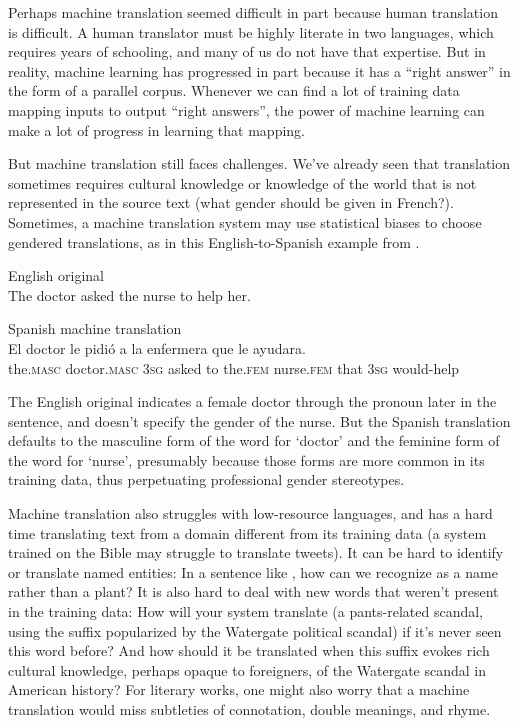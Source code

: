 Perhaps machine translation seemed difficult in part because human translation is difficult. A human translator must be highly literate in two languages, which requires years of schooling, and many of us do not have that expertise.  But in reality, machine learning has progressed in part because it has a ``right answer'' in the form of a parallel corpus.  Whenever we can find a lot of training data mapping inputs to output  ``right answers'', the power of machine learning can make a lot of progress in learning that mapping.

But machine translation still faces challenges.  We've already seen that translation sometimes requires cultural knowledge or knowledge of the world that is not represented in the source text (what gender should  be given in French?).  Sometimes, a machine translation system may use statistical biases to choose gendered translations, as in this English-to-Spanish example from \citet{Stanovsky-etal:2019}.  


\ea English original \\
	The doctor asked the nurse to help her.

\ex Spanish machine translation \\
    \gll El doctor le pidi\'o a la enfermera que le ayudara. \\
    the.\textsc{masc} doctor.\textsc{masc} 3\textsc{sg} asked to the.\textsc{fem} nurse.\textsc{fem} that 3\textsc{sg} would-help \\

\z 

The English original indicates a female doctor through the pronoun  later in the sentence, and doesn't specify the gender of the nurse.  But the Spanish translation defaults to the masculine form of the word for `doctor' and the feminine form of the word for `nurse', presumably because those forms are more common in its training data, thus perpetuating professional gender stereotypes.

Machine translation also struggles with low-resource languages, and has a hard time  translating text from a domain different from its training data (a system trained on the Bible may struggle to translate tweets).  It can be hard to identify or translate named entities: In a sentence like , how can we recognize  as a name rather than a plant?  It is also hard to deal with new words that weren't present in the training data: How will your system translate  (a pants-related scandal, using the  suffix popularized by the Watergate political scandal) if it's never seen this word before?  And how should it be translated when this  suffix evokes rich cultural knowledge, perhaps opaque to foreigners, of the Watergate scandal in American history?  For literary works, one might also worry that a machine translation would miss subtleties of connotation, double meanings, and rhyme. 

